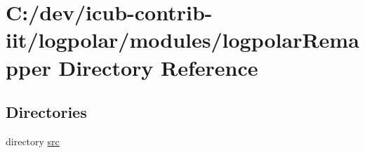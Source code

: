 \section{C\+:/dev/icub-\/contrib-\/iit/logpolar/modules/logpolar\+Remapper Directory Reference}
\label{dir_d034c5d20584dcbf7d9c8b029dc89c92}
\subsection*{Directories}
\begin{DoxyCompactItemize}
\item 
directory \hyperlink{dir_359f6f258b16793891881c960d9d52ad}{src}
\end{DoxyCompactItemize}
